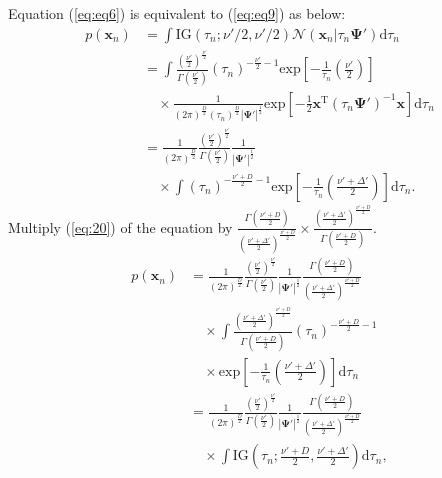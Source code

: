 \documentclass[journal]{IEEEtran}
\begin{document}
Equation (\ref{eq:eq6}) is equivalent to (\ref{eq:eq9}) as below:
\begin{align}
	p(\mathbf{x}_n) &= \int \mathrm{IG}(\tau_n;\nu'/2,\nu'/2) \mathcal{N}(\mathbf{x}_n|\tau_n \mathbf{\Psi}') \mathrm{d}{\tau_n} \nonumber\\
	&= \int \frac{\left(\frac{\nu'}{2}\right)^{\frac{\nu'}{2}}}{\Gamma \left(\frac{\nu'}{2}\right)} (\tau_n)^{-\frac{\nu'}{2}-1} \mathrm{exp} \left[-\frac{1}{\tau_n} \left(\frac{\nu'}{2} \right) \right] \nonumber\\
	&\quad\times\frac{1}{(2\pi)^{\frac{D}{2}}(\tau_n)^{\frac{D}{2}}|\mathbf{\Psi'}|^{\frac{1}{2}}} \mathrm{exp} \left[-\frac{1}{2}\mathbf{x}^\mathrm{T} (\tau_n\mathbf{\Psi'})^{-1} \mathbf{x}\right] \mathrm{d}{\tau_n} \nonumber\\
	&=\frac{1}{(2\pi)^{\frac{D}{2}}}\frac{\left(\frac{\nu'}{2}\right)^{\frac{\nu'}{2}}}{\Gamma \left(\frac{\nu'}{2}\right)}\frac{1}{|\mathbf{\Psi'}|^{\frac{1}{2}}} \nonumber\\
	\label{eq:20}
	&\quad\times \int (\tau_n)^{-\frac{\nu'+D}{2}-1} \mathrm{exp} \left[-\frac{1}{\tau_n} \left(\frac{\nu' + \Delta'}{2}\right) \right] \mathrm{d}{\tau_n}.
\end{align}
Multiply (\ref{eq:20}) of the equation by $\frac{\Gamma \left(\frac{\nu'+D}{2}\right)}{\left(\frac{\nu'+\Delta'}{2}\right)^{\frac{\nu'+D}{2}}} \times \frac{\left(\frac{\nu'+\Delta'}{2}\right)^{\frac{\nu'+D}{2}}}{\Gamma \left(\frac{\nu'+D}{2}\right)}$.
\begin{align}
	p(\mathbf{x}_n) &=\frac{1}{(2\pi)^{\frac{D}{2}}}\frac{\left(\frac{\nu'}{2}\right)^{\frac{\nu'}{2}}}{\Gamma \left(\frac{\nu'}{2}\right)}\frac{1}{|\mathbf{\Psi'}|^{\frac{1}{2}}} \frac{\Gamma \left(\frac{\nu'+D}{2}\right)}{\left(\frac{\nu'+\Delta'}{2}\right)^{\frac{\nu'+D}{2}}}\nonumber\\
	&\quad\times \int \frac{\left(\frac{\nu'+\Delta'}{2}\right)^{\frac{\nu'+D}{2}}}{\Gamma \left(\frac{\nu'+D}{2}\right)} (\tau_n)^{-\frac{\nu'+D}{2}-1} \nonumber\\
	&\quad\times \mathrm{exp} \left[-\frac{1}{\tau_n} \left(\frac{\nu' + \Delta'}{2}\right) \right] \mathrm{d}{\tau_n} \nonumber\\
	&=\frac{1}{(2\pi)^{\frac{D}{2}}}\frac{\left(\frac{\nu'}{2}\right)^{\frac{\nu'}{2}}}{\Gamma \left(\frac{\nu'}{2}\right)}\frac{1}{|\mathbf{\Psi'}|^{\frac{1}{2}}} \frac{\Gamma \left(\frac{\nu'+D}{2}\right)}{\left(\frac{\nu'+\Delta'}{2}\right)^{\frac{\nu'+D}{2}}}\nonumber\\
	\label{eq:21}
	&\quad\times \int \mathrm{IG}(\tau_n;\frac{\nu'+D}{2},\frac{\nu'+\Delta'}{2}) \mathrm{d}{\tau_n},
\end{align}
\end{document}
